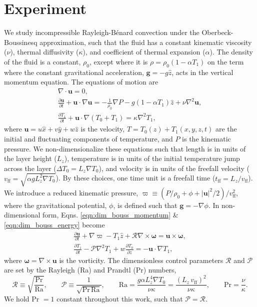 \documentclass[aps, pre, onecolumn, nofootinbib, notitlepage, groupedaddress, amsfonts, amssymb, amsmath, longbibliography]{revtex4-1}
\newcommand{\DivU}{\ensuremath{\nabla\cdot\bm{u}}}
\newcommand{\grad}{\ensuremath{\nabla}}
\newcommand{\RB}{Rayleigh-B\'{e}nard }
\begin{document}
\section{Experiment}
\label{sec:experiment}
We study incompressible \RB convection under the Oberbeck-Boussinesq approximation,
such that the fluid
has a constant kinematic viscosity ($\nu$), thermal diffusivity ($\kappa$), and coefficient
of thermal expansion ($\alpha$). The density of the fluid is a constant, $\rho_0$,
except where it is $\rho = \rho_0(1  - \alpha T_1)$ on the term where
the constant gravitational acceleration, $\bm{g} = - g\hat{z}$, 
acts in the vertical momentum equation.
The equations of motion are \cite{spiegel&veronis1960}
\begin{gather}
\DivU = 0, 
	\label{eqn:incompressible}
\\
\frac{\partial \bm{u}}{\partial t} + \bm{u}\cdot\grad\bm{u} =
-\frac{1}{\rho_0}\grad P - g( 1 - \alpha T_1)\hat{z} + \nu\grad^2\bm{u}, 
	\label{eqn:dim_bouss_momentum}
\\
\frac{\partial T_1}{\partial t} + \bm{u}\cdot\grad(T_0 + T_1) = \kappa\grad^2 T_1,
	\label{eqn:dim_bouss_energy}
\end{gather}
where $\bm{u} = u\hat{x} + v\hat{y} + w\hat{z}$ is the velocity, 
$T = T_0(z) + T_1(x, y, z, t)$ are the initial and fluctuating components of temperature, 
and $P$ is the kinematic pressure.
We non-dimensionalize these equations such that
length is in units of the layer height ($L_z$),
temperature is in units of the initial temperature jump across the layer ($\Delta T_0 = L_z \grad T_0$), 
and velocity is in units of the freefall velocity ($v_{\text{ff}} = \sqrt{\alpha g L_z^2 \grad T_0}$).
By these choices, one time unit is a freefall time ($t_{\text{ff}} = L_z/v_{\text{ff}}$).
We introduce a reduced kinematic pressure,
$\varpi \equiv (P / \rho_0 + \phi + |\bm{u}|^2 / 2) / v_{\text{ff}}^2$, where the gravitational
potential, $\phi$, is defined such that $\bm{g} = -\grad \phi$. 
In non-dimensional form, Eqns. \ref{eqn:dim_bouss_momentum} \& \ref{eqn:dim_bouss_energy}
become
\begin{gather}
\frac{\partial \bm{u}}{\partial t} + \grad \varpi - T_1\hat{z} + \mathcal{R}\grad\times\bm{\omega} = \bm{u}\times\bm{\omega},
	\label{eqn:bouss_momentum}
\\
\frac{\partial T_1}{\partial t} - \mathcal{P}\grad^2 T_1 + w \frac{\partial T_0}{\partial z} = - \bm{u}\cdot\grad T_1,
	\label{eqn:bouss_energy}
\end{gather}
where $\bm{\omega} = \grad \times \bm{u}$ is the vorticity.
The dimensionless control parameters $\mathcal{R}$ and $\mathcal{P}$ 
are set by the Rayleigh (Ra) and Prandtl (Pr) numbers,
\begin{equation}
\mathcal{R} \equiv \sqrt{\frac{\text{Pr}}{\text{Ra}}}, \qquad \mathcal{P} \equiv \frac{1}{\sqrt{\text{Pr}\,\text{Ra}}}, \qquad
\text{Ra} = \frac{g \alpha L_z^4 \grad T_0}{\nu\kappa} = \frac{(L_z\,v_{\text{ff}})^2}{\nu\kappa}, \qquad \text{Pr} = \frac{\nu}{\kappa}.
\end{equation}
We hold Pr $= 1$ constant throughout this work, such that $\mathcal{P} = \mathcal{R}$.
\end{document}

